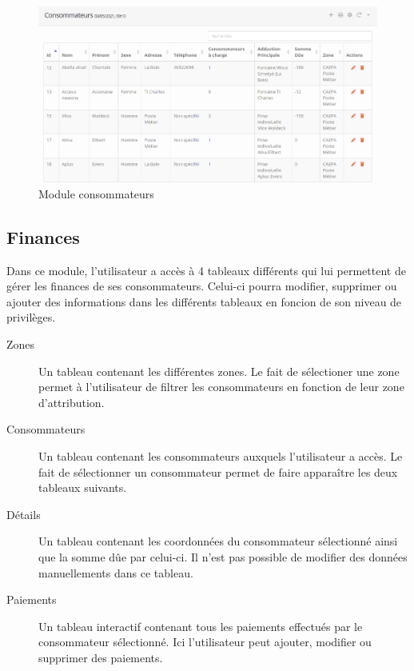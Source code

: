 \documentclass{EPL-master-thesis-covers-FR}
\begin{document}
				\begin{figure}[H]
					\centering
					\includegraphics[width=1\textwidth]{images/consumer_tab1}
					\caption{Module consommateurs}
				\end{figure}
			
\newpage
			\subsection{Finances}
				Dans ce module, l'utilisateur a accès à 4 tableaux différents qui lui permettent de gérer les finances de ses consommateurs. Celui-ci pourra modifier, supprimer ou ajouter des informations dans les différents tableaux en foncion de son niveau de privilèges.
				\begin{description}
					\item[Zones] Un tableau contenant les différentes zones. Le fait de sélectioner une zone permet à l'utilisateur de filtrer les consommateurs en fonction de leur zone d'attribution.
					\item[Consommateurs] Un tableau contenant les consommateurs auxquels l'utilisateur a accès. Le fait de sélectionner un consommateur permet de faire apparaître les deux tableaux suivants.
					\item[Détails] Un tableau contenant les coordonnées du consommateur sélectionné ainsi que la somme dûe par celui-ci. Il n'est pas possible de modifier des données manuellements dans ce tableau.
					\item[Paiements] Un tableau interactif contenant tous les paiements effectués par le consommateur sélectionné. Ici l'utilisateur peut ajouter, modifier ou supprimer des paiements.
				\end{description}
				
\end{document}
